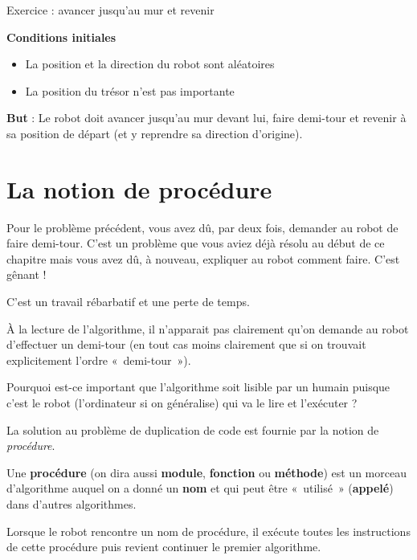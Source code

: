 	
	\begin{Emphase}[exercice]{Exercice : avancer jusqu'au mur et revenir}

		\textbf{Conditions initiales}

		\begin{itemize}
		\item La position et la direction du robot sont aléatoires
		\item La position du trésor n'est pas importante
		\end{itemize}
		
		\textbf{But} : Le robot doit avancer jusqu'au mur
		devant lui, faire demi-tour et revenir à sa position de départ 
		(et y reprendre sa direction d'origine).

	\end{Emphase}

\section{La notion de procédure}

	Pour le problème précédent, vous avez dû, par deux fois, demander au
	robot de faire demi-tour. C'est un problème que vous
	aviez déjà résolu au début de ce chapitre mais vous avez dû, à nouveau,
	expliquer au robot comment faire. C'est gênant !

	\begin{liste}
	\item C'est un travail rébarbatif et une perte de temps.
	\item 
		À la lecture de l'algorithme, 
		il n'apparait pas clairement qu'on demande au robot 
		d'effectuer un demi-tour
		(en tout cas moins clairement que si on trouvait explicitement
		l'ordre «~demi-tour~»).
	\end{liste}

	Pourquoi est-ce important que l'algorithme soit lisible
	par un humain puisque c'est le robot
	(l'ordinateur si on généralise) qui va le lire et
	l'exécuter ?

	La solution au problème de duplication de code est fournie par la notion
	de \textit{procédure}.

	Une \textbf{procédure} (on dira aussi \textbf{module}, \textbf{fonction}
	ou \textbf{méthode}) est un morceau d'algorithme
	auquel on a donné un \textbf{nom} et qui peut être «~utilisé~»
	(\textbf{appelé}) dans d'autres algorithmes.

	Lorsque le robot rencontre un nom de procédure, il exécute toutes les
	instructions de cette procédure puis revient continuer le premier
	algorithme.

